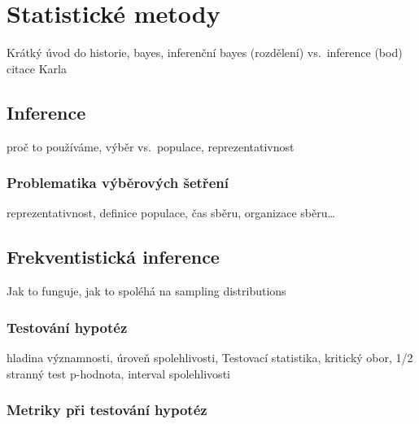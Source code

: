 \documentclass[
  11pt,
  a4paper]{report}
\author{}
\date{}
\begin{document}














\chapter{Statistické metody}\label{statistickuxe9-metody}

Krátký úvod do historie, bayes, inferenční bayes (rozdělení)
vs.~inference (bod) citace Karla

\section{Inference}\label{inference}

proč to používáme, výběr vs.~populace, reprezentativnost

\subsection{Problematika výběrových
šetření}\label{problematika-vuxfdbux11brovuxfdch-ux161etux159enuxed}

reprezentativnost, definice populace, čas sběru, organizace
sběru\ldots{}

\section{Frekventistická inference}\label{frekventistickuxe1-inference}

Jak to funguje, jak to spoléhá na sampling distributions

\subsection{Testování hypotéz}\label{testovuxe1nuxed-hypotuxe9z}

hladina významnosti, úroveň spolehlivosti, Testovací statistika,
kritický obor, 1/2 stranný test p-hodnota, interval spolehlivosti

\subsection{Metriky při testování
hypotéz}\label{metriky-pux159i-testovuxe1nuxed-hypotuxe9z}
\end{document}
